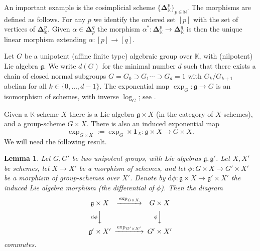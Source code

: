 \documentclass[10pt]{amsart}
\newtheorem{lem}[equation]{Lemma}
\theoremstyle{definition}
\numberwithin{equation}{section}
\newcommand{\opn}{\operatorname}
\newcommand{\mfrak}[1]{\mathfrak{#1}}
\newcommand{\mrm}[1]{\mathrm{#1}}
\newcommand{\mbb}[1]{\mathbb{#1}}
\newcommand{\tup}[1]{\textup{#1}}
\newcommand{\bsym}[1]{\boldsymbol{#1}}
\newcommand{\K}{\mbb{K}}
\begin{document}
An important example is the cosimplicial scheme 
$\{ \bsym{\Delta}^p_{\K} \}_{p \in \mbb{N}}$.
The morphisms are defined as follows. 
For any $p$ we identify the ordered set 
$[p]$ with the set of vertices of $\bsym{\Delta}^p_{\K}$. 
Given $\alpha \in \bsym{\Delta}^q_{p}$ the morphism
$\alpha^* : \bsym{\Delta}^p_{\K} \to \bsym{\Delta}^q_{\K}$
is then the unique linear morphism extending 
$\alpha : [p] \to [q]$. 

Let $G$ be a unipotent (affine finite type)
algebraic group over $\K$, with 
(nilpotent) Lie algebra $\mfrak{g}$. We write $d(G)$ for the minimal 
number $d$ such that there exists a chain of closed normal subgroups
$G = G_0 \supset G_1 \cdots \supset G_d = 1$
with $G_k / G_{k+1}$ abelian 
for all $k \in \{ 0, \ldots, d-1 \}$. The exponential map
$\opn{exp}_G : \mfrak{g} \to G$ is an isomorphism
of schemes, with inverse $\opn{log}_G$; see 
\cite[Theorem VIII.1.1]{Ho}.

Given a $\K$-scheme $X$ there is a Lie algebra 
$\mfrak{g} \times X$ (in the category of $X$-schemes), and a 
group-scheme $G \times X$. There is also an induced exponential 
map
\[ \opn{exp}_{G \times X} :=
\opn{exp}_G \times \bsym{1}_X  : 
\mfrak{g} \times X \to G \times X . \] 
We will need the following result. 

\begin{lem} \label{lem1.1}
Let $G, G'$ be two unipotent groups, with Lie algebras
$\mfrak{g}, \mfrak{g}'$. Let $X, X'$ be schemes, let 
$X \to X'$ be a morphism of schemes, and let
$\phi : G \times X \to G' \times X'$ be a morphism of 
group-schemes over $X'$. Denote by 
$\mrm{d} \phi : \mfrak{g} \times X \to \mfrak{g}' \times X'$
the induced Lie algebra morphism \tup{(}the differential of 
$\phi$\tup{)}. Then the diagram
\begin{equation} \label{eqn1.6}
\begin{CD}
\mfrak{g} \times X @>{\opn{exp}_{G \times X}}>> G \times X \\
@V{\mrm{d} \phi}VV @V{\phi}VV \\
\mfrak{g}' \times X' @>{\opn{exp}_{G' \times X'}}>> G' \times X'
\end{CD} 
\end{equation}
commutes.
\end{lem}
\end{document}
